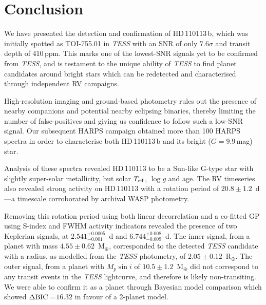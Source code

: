 \documentclass[fleqn,usenatbib]{mnras}
\newcommand{\tess}{{\it TESS}}
\newcommand{\harps}{{HARPS}}
\newcommand{\rearth}{R$_{\oplus}$}
\newcommand{\mearth}{M$_{\oplus}$}
\newcommand{\teff}{$T_{\rm eff}$}
\newcommand{\logg}{$\log g$}
\newcommand{\TPzero}{ $ 2.541^{+0.0005}_{-0.001} $ }
\newcommand{\TPone}{ $ 6.744^{+0.008}_{-0.009} $ }
\newcommand{\TMpzero}{ $ 4.55 \pm 0.62 $ }
\newcommand{\TMpone}{ $ 10.5 \pm 1.2 $ }
\newcommand{\Trpl}{ $ 2.05 \pm 0.12 $ }
\newcommand{\Tperiod}{ $ 20.8 \pm 1.2 $ }
\newcommand{\Tdepth}{410\,ppm}
\newcommand{\TTplanet}{TOI-755.01}
\newcommand{\Tstar}{HD\,110113}
\newcommand{\Tplanet}{HD\,110113\,b}
\newcommand{\TdeltaBIC}{$16.32$}
\begin{document}

\section{Conclusion}
\label{sec:conclusion}
We have presented the detection and confirmation of \Tplanet{}, which was initially spotted as \TTplanet{} in \tess{} with an SNR of only $7.6\sigma$ and transit depth of \Tdepth{}.
This marks one of the lowest-SNR signals yet to be confirmed from \tess{}, and is testament to the unique ability of \tess{} to find planet candidates around bright stars which can be redetected and characterised through independent RV campaigns.

High-resolution imaging and ground-based photometry rules out the presence of nearby companions and potential nearby eclipsing binaries, thereby limiting the number of false-positives and giving us confidence to follow such a low-SNR signal.
Our subsequent HARPS campaign obtained more than 100 \harps{} spectra in order to characterise both \Tplanet{} and its bright ($G=9.9$\,mag) star.

Analysis of these spectra revealed \Tstar{} to be a Sun-like G-type star with slightly super-solar metallicity, but solar \teff{}, \logg{} and age.
The RV timeseries also revealed strong activity on \Tstar{} with a rotation period of \Tperiod{}\,d---a timescale corroborated by archival WASP photometry.

Removing this rotation period using both linear decorrelation and a co-fitted GP using S-index and FWHM activity indicators revealed the presence of two Keplerian signals, at \TPzero{}\,d and \TPone{}\,d.
The inner signal, from a planet with mass \TMpzero{}\,\mearth{}, corresponded to the detected \tess{} candidate with a radius, as modelled from the \tess{} photometry, of \Trpl{}\,\rearth{}.
The outer signal, from a planet with $M_p\sin{i}$ of \TMpone{}\,\mearth{} did not correspond to any transit events in the \tess{} lightcurve, and therefore is likely non-transiting.
We were able to confirm it as a planet through Bayesian model comparison which showed $\Delta{\rm BIC}= $\TdeltaBIC{} in favour of a 2-planet model.
\end{document}

